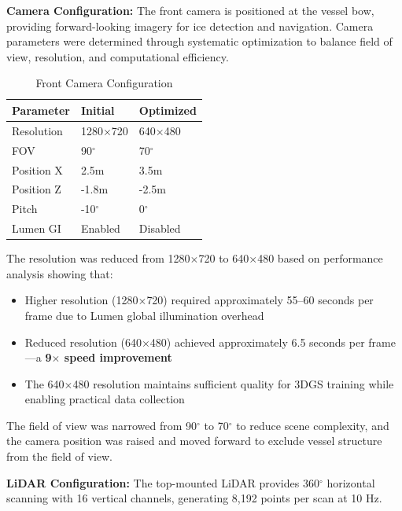 \textbf{Camera Configuration:} The front camera is positioned at the vessel bow, providing forward-looking imagery for ice detection and navigation. Camera parameters were determined through systematic optimization to balance field of view, resolution, and computational efficiency.

\begin{table}[htbp]
\centering
\caption{Front Camera Configuration}
\label{tab:camera_config}
\begin{tabular}{@{}lll@{}}
\toprule
\textbf{Parameter} & \textbf{Initial} & \textbf{Optimized} \\
\midrule
Resolution & 1280$\times$720 & 640$\times$480 \\
FOV & 90$^\circ$ & 70$^\circ$ \\
Position X & 2.5m & 3.5m \\
Position Z & -1.8m & -2.5m \\
Pitch & -10$^\circ$ & 0$^\circ$ \\
Lumen GI & Enabled & Disabled \\
\bottomrule
\end{tabular}
\end{table}

The resolution was reduced from 1280$\times$720 to 640$\times$480 based on performance analysis showing that:

\begin{itemize}
    \item Higher resolution (1280$\times$720) required approximately 55--60 seconds per frame due to Lumen global illumination overhead
    \item Reduced resolution (640$\times$480) achieved approximately 6.5 seconds per frame---a \textbf{9$\times$ speed improvement}
    \item The 640$\times$480 resolution maintains sufficient quality for 3DGS training while enabling practical data collection
\end{itemize}

The field of view was narrowed from 90$^\circ$ to 70$^\circ$ to reduce scene complexity, and the camera position was raised and moved forward to exclude vessel structure from the field of view.

\textbf{LiDAR Configuration:} The top-mounted LiDAR provides 360$^\circ$ horizontal scanning with 16 vertical channels, generating 8,192 points per scan at 10 Hz.

